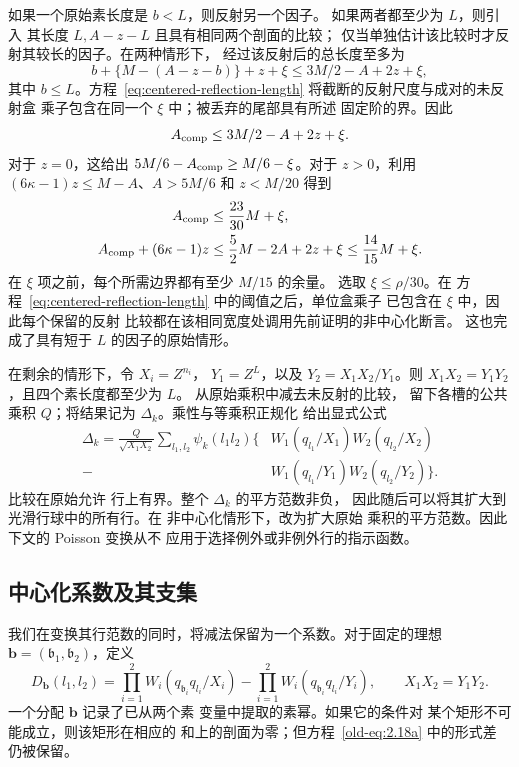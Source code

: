 \documentclass[11pt,a4paper]{article}
\numberwithin{equation}{section}
\numberwithin{figure}{section}
\theoremstyle{definition}
\theoremstyle{remark}
\begin{document}
如果一个原始素长度是 \(b<L\)，则反射另一个因子。
如果两者都至少为 \(L\)，则引入
其长度 \(L,A-z-L\) 且具有相同两个剖面的比较；
仅当单独估计该比较时才反射其较长的因子。在两种情形下，
经过该反射后的总长度至多为
\[
 b+\{M-(A-z-b)\}+z+\xi
 \le 3M/2-A+2z+\xi,
\]
其中 \(b\le L\)。方程~\eqref{eq:centered-reflection-length}
将截断的反射尺度与成对的未反射盒
乘子包含在同一个 \(\xi\) 中；被丢弃的尾部具有所述
固定阶的界。因此
\begin{equation}
 A_{\rm comp}\le3M/2-A+2z+\xi.
 \label{old-eq:3.11}
\end{equation}
对于 \(z=0\)，这给出
\(5M/6-A_{\rm comp}\ge M/6-\xi\)。对于 \(z>0\)，利用
\((6\kappa-1)z\le M-A\)、\(A>5M/6\) 和 \(z<M/20\) 得到
\begin{equation}
 \begin{aligned}
 A_{\rm comp}&\le\frac{23}{30}M+\xi,\\
 A_{\rm comp}+(6\kappa-1)z
 &\le\frac52M-2A+2z+\xi\le\frac{14}{15}M+\xi.
 \end{aligned}
 \label{eq:comparison-uncentered-margin}
\end{equation}
在 \(\xi\) 项之前，每个所需边界都有至少 \(M/15\) 的余量。
选取 \(\xi\le\rho/30\)。在
方程~\eqref{eq:centered-reflection-length} 中的阈值之后，单位盒乘子
已包含在 \(\xi\) 中，因此每个保留的反射
比较都在该相同宽度处调用先前证明的非中心化断言。
这也完成了具有短于 \(L\) 的因子的原始情形。

在剩余的情形下，令 \(X_i=Z^{n_i}\)，
\(Y_1=Z^L\)，以及 \(Y_2=X_1X_2/Y_1\)。则
\(X_1X_2=Y_1Y_2\)，且四个素长度都至少为 \(L\)。
从原始乘积中减去未反射的比较，
留下各槽的公共乘积 \(Q\)；将结果记为
\(\Delta_k\)。乘性与等乘积正规化
给出显式公式
\[
 \begin{split}
 \Delta_k
 =\frac{Q}{\sqrt{X_1X_2}}\sum_{l_1,l_2}\psi_k(l_1l_2)
 \bigl\{
 &W_1(q_{l_1}/X_1)W_2(q_{l_2}/X_2)\\
 -{}&W_1(q_{l_1}/Y_1)W_2(q_{l_2}/Y_2)
 \bigr\}.
 \end{split}
\]
比较在原始允许
行上有界。整个 \(\Delta_k\) 的平方范数非负，
因此随后可以将其扩大到光滑行球中的所有行。在
非中心化情形下，改为扩大原始
乘积的平方范数。因此下文的 Poisson 变换从不
应用于选择例外或非例外行的指示函数。

\subsection{中心化系数及其支集}

我们在变换其行范数的同时，将减法保留为一个系数。对于固定的理想
\(\mathbf b=(\mathfrak b_1,\mathfrak b_2)\)，定义
\begin{equation}
 D_{\mathbf b}(l_1,l_2)
 =
 \prod_{i=1}^2W_i(q_{\mathfrak b_i}q_{l_i}/X_i)
 -
 \prod_{i=1}^2W_i(q_{\mathfrak b_i}q_{l_i}/Y_i),
 \qquad X_1X_2=Y_1Y_2.
 \label{old-eq:2.18a}
\end{equation}
一个分配 \(\mathbf b\) 记录了已从两个素
变量中提取的素幂。如果它的条件对
某个矩形不可能成立，则该矩形在相应的
和上的剖面为零；但方程~\eqref{old-eq:2.18a} 中的形式差
仍被保留。
\end{document}
